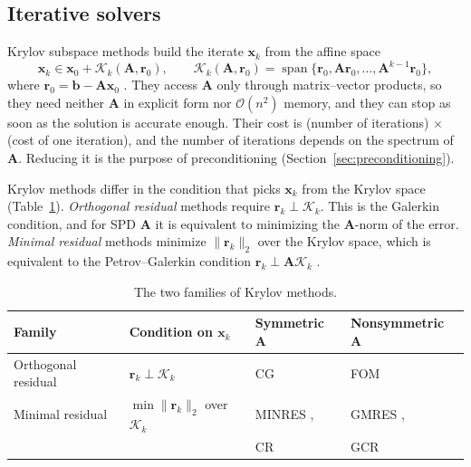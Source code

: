 \subsection{Iterative solvers}
\label{sec:iterative-solvers}

Krylov subspace methods build the iterate $\mathbf{x}_k$ from the affine space
\begin{equation}
  \mathbf{x}_k \in \mathbf{x}_0 + \mathcal{K}_k(\mathbf{A}, \mathbf{r}_0), \qquad
  \mathcal{K}_k(\mathbf{A}, \mathbf{r}_0) = \operatorname{span}\{\mathbf{r}_0, \mathbf{A}\mathbf{r}_0, \dots, \mathbf{A}^{k-1}\mathbf{r}_0\},
\end{equation}
where $\mathbf{r}_0 = \mathbf{b} - \mathbf{A}\mathbf{x}_0$ \citep{saad2003iterative}. They access $\mathbf{A}$ only through
matrix--vector products, so they need neither $\mathbf{A}$ in explicit form nor
$\mathcal{O}(n^2)$ memory, and they can stop as soon as the solution is accurate
enough. Their cost is (number of iterations) $\times$ (cost of one
iteration), and the number of iterations depends on the spectrum of $\mathbf{A}$. Reducing it is the purpose of preconditioning
(Section~\ref{sec:preconditioning}).

Krylov methods differ in the condition that picks $\mathbf{x}_k$ from the
Krylov space (Table~\ref{tab:krylov-families}). \emph{Orthogonal residual}
methods require $\mathbf{r}_k \perp \mathcal{K}_k$. This is the Galerkin
condition, and for SPD $\mathbf{A}$ it is equivalent to minimizing the
$\mathbf{A}$-norm of the error. \emph{Minimal residual} methods minimize
$\|\mathbf{r}_k\|_2$ over the Krylov space, which is equivalent to the
Petrov--Galerkin condition $\mathbf{r}_k \perp \mathbf{A}\mathcal{K}_k$
\citep{saad2003iterative}.

\begin{table}[h]
  \centering
  \begin{tabular}{@{}llll@{}}
    \toprule
    Family & Condition on $\mathbf{x}_k$ & Symmetric $\mathbf{A}$ & Nonsymmetric $\mathbf{A}$ \\
    \midrule
    Orthogonal residual & $\mathbf{r}_k \perp \mathcal{K}_k$ & CG \citep{hestenes1952methods} & FOM \citep{saad2003iterative} \\
    Minimal residual & $\min \|\mathbf{r}_k\|_2$ over $\mathcal{K}_k$ & MINRES \citep{paige1975solution}, & GMRES \citep{saad1986gmres}, \\
     & & CR \citep{stiefel1955relaxationsmethoden} & GCR \citep{eisenstat1983variational} \\
    \bottomrule
  \end{tabular}
  \caption{The two families of Krylov methods.}
  \label{tab:krylov-families}
\end{table}

